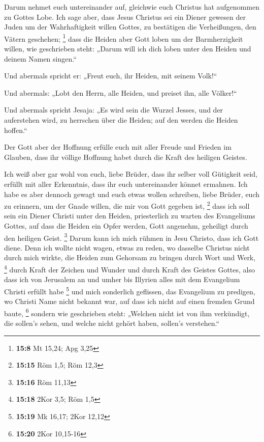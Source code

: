  Darum nehmet euch untereinander auf, gleichwie euch
Christus hat aufgenommen zu Gottes Lobe.  Ich sage aber,
dass Jesus Christus sei ein Diener gewesen der Juden um der
Wahrhaftigkeit willen Gottes, zu bestätigen die Verheißungen, den Vätern
geschehen; \footnote{\textbf{15:8} Mt 15,24; Apg 3,25}  dass
die Heiden aber Gott loben um der Barmherzigkeit willen, wie geschrieben
steht: „Darum will ich dich loben unter den Heiden und deinem Namen
singen.``

 Und abermals spricht er: „Freut euch, ihr Heiden, mit
seinem Volk!{}``

 Und abermals: „Lobt den Herrn, alle Heiden, und preiset
ihn, alle Völker!{}``

 Und abermals spricht Jesaja: „Es wird sein die Wurzel
Jesses, und der auferstehen wird, zu herrschen über die Heiden; auf den
werden die Heiden hoffen.``

 Der Gott aber der Hoffnung erfülle euch mit aller Freude
und Frieden im Glauben, dass ihr völlige Hoffnung habet durch die Kraft
des heiligen Geistes.

 Ich weiß aber gar wohl von euch, liebe Brüder, dass ihr
selber voll Gütigkeit seid, erfüllt mit aller Erkenntnis, dass ihr euch
untereinander könnet ermahnen.  Ich habe es aber dennoch
gewagt und euch etwas wollen schreiben, liebe Brüder, euch zu erinnern,
um der Gnade willen, die mir von Gott gegeben ist, \footnote{\textbf{15:15}
  Röm 1,5; Röm 12,3}  dass ich soll sein ein Diener Christi
unter den Heiden, priesterlich zu warten des Evangeliums Gottes, auf
dass die Heiden ein Opfer werden, Gott angenehm, geheiligt durch den
heiligen Geist. \footnote{\textbf{15:16} Röm 11,13}  Darum
kann ich mich rühmen in Jesu Christo, dass ich Gott diene. 
Denn ich wollte nicht wagen, etwas zu reden, wo dasselbe Christus nicht
durch mich wirkte, die Heiden zum Gehorsam zu bringen durch Wort und
Werk, \footnote{\textbf{15:18} 2Kor 3,5; Röm 1,5}  durch
Kraft der Zeichen und Wunder und durch Kraft des Geistes Gottes, also
dass ich von Jerusalem an und umher bis Illyrien alles mit dem
Evangelium Christi erfüllt habe \footnote{\textbf{15:19} Mk 16,17; 2Kor
  12,12}  und mich sonderlich geflissen, das Evangelium zu
predigen, wo Christi Name nicht bekannt war, auf dass ich nicht auf
einen fremden Grund baute, \footnote{\textbf{15:20} 2Kor 10,15-16}
 sondern wie geschrieben steht: „Welchen nicht ist von ihm
verkündigt, die sollen's sehen, und welche nicht gehört haben, sollen's
verstehen.``

